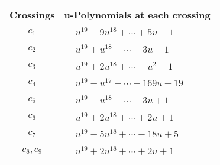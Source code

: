 \documentclass[1p]{elsarticle_modified}
\theoremstyle{definition}
\begin{document}
\begin{tabular}{m{50pt}|m{274pt}}
Crossings & \hspace{64pt}u-Polynomials at each crossing \\
\hline $$\begin{aligned}c_{1}\end{aligned}$$&$\begin{aligned}
&u^{19}-9 u^{18}+\cdots+5 u-1
\end{aligned}$\\
\hline $$\begin{aligned}c_{2}\end{aligned}$$&$\begin{aligned}
&u^{19}+u^{18}+\cdots-3 u-1
\end{aligned}$\\
\hline $$\begin{aligned}c_{3}\end{aligned}$$&$\begin{aligned}
&u^{19}+2 u^{18}+\cdots- u^2-1
\end{aligned}$\\
\hline $$\begin{aligned}c_{4}\end{aligned}$$&$\begin{aligned}
&u^{19}- u^{17}+\cdots+169 u-19
\end{aligned}$\\
\hline $$\begin{aligned}c_{5}\end{aligned}$$&$\begin{aligned}
&u^{19}- u^{18}+\cdots-3 u+1
\end{aligned}$\\
\hline $$\begin{aligned}c_{6}\end{aligned}$$&$\begin{aligned}
&u^{19}+2 u^{18}+\cdots+2 u+1
\end{aligned}$\\
\hline $$\begin{aligned}c_{7}\end{aligned}$$&$\begin{aligned}
&u^{19}-5 u^{18}+\cdots-18 u+5
\end{aligned}$\\
\hline $$\begin{aligned}c_{8},c_{9}\end{aligned}$$&$\begin{aligned}
&u^{19}+2 u^{18}+\cdots+2 u+1
\end{aligned}$\\

\end{tabular}
\end{document}
